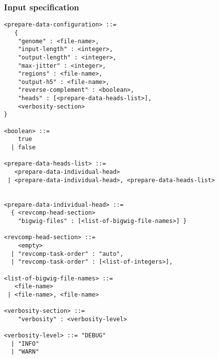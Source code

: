 \documentclass{article}
\begin{document}
\subsubsection{Input specification}

\begin{lstlisting}
<prepare-data-configuration> ::=
   {
    "genome" : <file-name>,
    "input-length" : <integer>,
    "output-length" : <integer>,
    "max-jitter" : <integer>,
    "regions" : <file-name>,
    "output-h5" : <file-name>,
    "reverse-complement" : <boolean>,
    "heads" : [<prepare-data-heads-list>],
    <verbosity-section>
}

<boolean> ::=
    true
  | false

<prepare-data-heads-list> ::=
   <prepare-data-individual-head>
 | <prepare-data-individual-head>, <prepare-data-heads-list>


<prepare-data-individual-head> ::=
  { <revcomp-head-section>
    "bigwig-files" : [<list-of-bigwig-file-names>] }

<revcomp-head-section> ::=
    <empty>
  | "revcomp-task-order" : "auto",
  | "revcomp-task-order" : [<list-of-integers>],

<list-of-bigwig-file-names> ::=
   <file-name>
 | <file-name>, <file-name>

<verbosity-section> ::=
    "verbosity" : <verbosity-level>

<verbosity-level> ::= "DEBUG"
  | "INFO"
  | "WARN"

\end{lstlisting}
\end{document}
